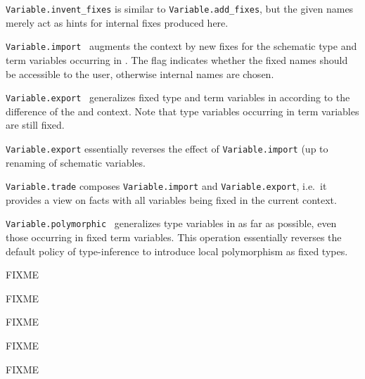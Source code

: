 \begin{isabellebody}
\begin{isamarkuptext}
\begin{description}
  \item \verb|Variable.invent_fixes| is similar to \verb|Variable.add_fixes|, but the given names merely act as hints for
  internal fixes produced here.

  \item \verb|Variable.import|~ augments the
  context by new fixes for the schematic type and term variables
  occurring in .  The  flag indicates
  whether the fixed names should be accessible to the user, otherwise
  internal names are chosen.

  \item \verb|Variable.export|~ generalizes
  fixed type and term variables in  according to the
  difference of the  and  context.  Note
  that type variables occurring in term variables are still fixed.

  \verb|Variable.export| essentially reverses the effect of \verb|Variable.import| (up to renaming of schematic variables.

  \item \verb|Variable.trade| composes \verb|Variable.import| and \verb|Variable.export|, i.e.\ it provides a view on facts with all
  variables being fixed in the current context.

  \item \verb|Variable.polymorphic|~ generalizes type
  variables in  as far as possible, even those occurring
  in fixed term variables.  This operation essentially reverses the
  default policy of type-inference to introduce local polymorphism as
  fixed types.

  \end{description}%
\end{isamarkuptext}%
\isamarkuptrue%
%
\endisatagmlref
{\isafoldmlref}%
%
\isadelimmlref
%
\endisadelimmlref
%
\begin{isamarkuptext}%
FIXME%
\end{isamarkuptext}%
\isamarkuptrue%
%
\isamarkuptrue%
%
\begin{isamarkuptext}%
FIXME%
\end{isamarkuptext}%
\isamarkuptrue%
%
\isamarkuptrue%
%
\begin{isamarkuptext}%
FIXME%
\end{isamarkuptext}%
\isamarkuptrue%
%
\isamarkuptrue%
%
\begin{isamarkuptext}%
FIXME%
\end{isamarkuptext}%
\isamarkuptrue%
%
\isamarkuptrue%
%
\begin{isamarkuptext}%
FIXME


\end{isamarkuptext}
\end{isabellebody}
